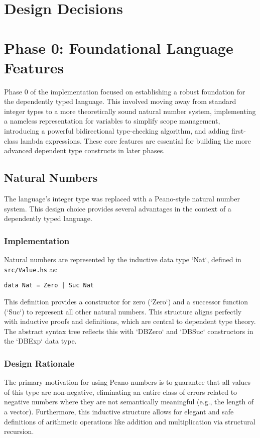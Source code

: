 \section{Design Decisions}

\section{Phase 0: Foundational Language Features}

Phase 0 of the implementation focused on establishing a robust foundation for the dependently typed language. This involved moving away from standard integer types to a more theoretically sound natural number system, implementing a nameless representation for variables to simplify scope management, introducing a powerful bidirectional type-checking algorithm, and adding first-class lambda expressions. These core features are essential for building the more advanced dependent type constructs in later phases.

\subsection{Natural Numbers}

The language's integer type was replaced with a Peano-style natural number system. This design choice provides several advantages in the context of a dependently typed language.

\subsubsection{Implementation}
Natural numbers are represented by the inductive data type `Nat`, defined in \texttt{src/Value.hs} as:
\begin{verbatim}
data Nat = Zero | Suc Nat
\end{verbatim}
This definition provides a constructor for zero (`Zero`) and a successor function (`Suc`) to represent all other natural numbers. This structure aligns perfectly with inductive proofs and definitions, which are central to dependent type theory. The abstract syntax tree reflects this with `DBZero` and `DBSuc` constructors in the `DBExp` data type.

\subsubsection{Design Rationale}
The primary motivation for using Peano numbers is to guarantee that all values of this type are non-negative, eliminating an entire class of errors related to negative numbers where they are not semantically meaningful (e.g., the length of a vector). Furthermore, this inductive structure allows for elegant and safe definitions of arithmetic operations like addition and multiplication via structural recursion.


